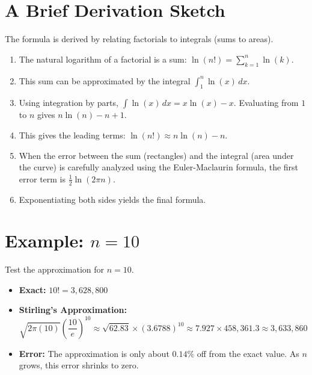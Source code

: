 \documentclass[11pt]{article}
\begin{document}
\hrulefill

\section{A Brief Derivation Sketch}
The formula is derived by relating factorials to integrals (sums to areas).

\begin{enumerate}
    \item The natural logarithm of a factorial is a sum: \(\ln(n!) = \sum_{k=1}^n \ln(k)\).
    \item This sum can be approximated by the integral \(\int_1^n \ln(x) \, dx\). 
    \item Using integration by parts, \(\int \ln(x) \, dx = x \ln(x) - x\). Evaluating from \(1\) to \(n\) gives \(n \ln(n) - n + 1\).
    \item This gives the leading terms: \(\ln(n!) \approx n \ln(n) - n\).
    \item When the error between the sum (rectangles) and the integral (area under the curve) is carefully analyzed using the Euler-Maclaurin formula, the first error term is \(\frac{1}{2}\ln(2\pi n)\). 
    \item Exponentiating both sides yields the final formula.
\end{enumerate}

\hrulefill

\section{Example: \(n = 10\)}
Test the approximation for \(n=10\).
\begin{itemize}
    \item \textbf{Exact:} \(10! = 3,628,800\)
    \item \textbf{Stirling's Approximation:}
    \[
 \sqrt{2\pi(10)} \left(\frac{10}{e}\right)^{10} \approx \sqrt{62.83} \times (3.6788)^{10} \approx 7.927 \times 458,361.3 \approx 3,633,860 
\]
    \item \textbf{Error:} The approximation is only about \(0.14\%\) off from the exact value. As \(n\) grows, this error shrinks to zero.
\end{itemize}

\hrulefill
\end{document}
